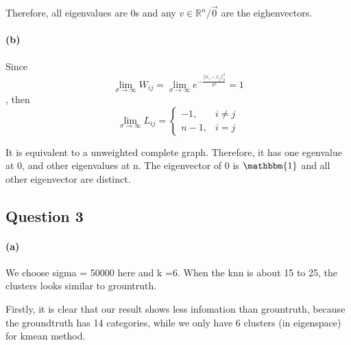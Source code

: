\documentclass{article}
\begin{document}
Therefore, all eigenvalues are 0s and any $v \in \mathbb{R}^n/{\vec{0}}$ are the eighenvectors.

\paragraph{(b)}
Since $$\lim_{\sigma \rightarrow \infty} W_{ij} = \lim_{\sigma \rightarrow \infty} e^{-\frac{||x_{i}-x_{j}||_{2}^{2}}{\sigma^{2}}} = 1 $$,
then $$ \lim_{\sigma \rightarrow \infty} L_{ij} = \begin{cases} -1, & i \neq j \\ n-1, & i=j  \end{cases} $$

It is equivalent to a unweighted complete graph. Therefore, it has one egenvalue at 0, and other eigenvalues at n. The eigenvector of 0 is $\mathbbm{1}$ and all other eigenvector are distinct.

\subsection*{Question 3}
\paragraph{(a)}
We choose sigma = 50000 here and k =6. When the knn is about 15 to 25, the clusters looks similar to grountruth.

Firstly, it is clear that our result shows less infomation than grountruth, because the groundtruth has 14 categories, while we only have 6 clusters (in eigenspace) for kmean method.
\end{document}
